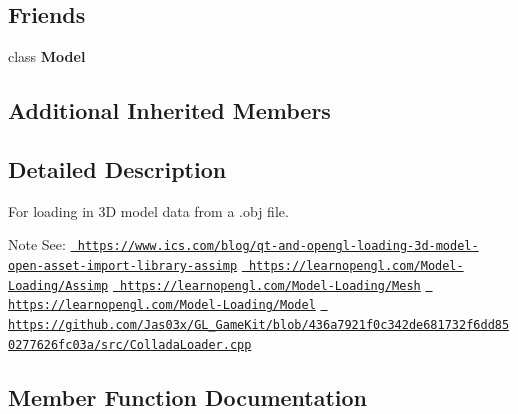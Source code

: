 \subsection*{Friends}
\begin{DoxyCompactItemize}
\item 
\mbox{\label{classrev_1_1_model_reader_a2bf2a0e9b454c55aa5dcb5aa4698697b}} 
class {\bfseries Model}
\end{DoxyCompactItemize}
\subsection*{Additional Inherited Members}


\subsection{Detailed Description}
For loading in 3D model data from a .obj file. 

\begin{DoxyNote}{Note}
See\+: \href{https://www.ics.com/blog/qt-and-opengl-loading-3d-model-open-asset-import-library-assimp}{\texttt{ https\+://www.\+ics.\+com/blog/qt-\/and-\/opengl-\/loading-\/3d-\/model-\/open-\/asset-\/import-\/library-\/assimp}} \href{https://learnopengl.com/Model-Loading/Assimp}{\texttt{ https\+://learnopengl.\+com/\+Model-\/\+Loading/\+Assimp}} \href{https://learnopengl.com/Model-Loading/Mesh}{\texttt{ https\+://learnopengl.\+com/\+Model-\/\+Loading/\+Mesh}} \href{https://learnopengl.com/Model-Loading/Model}{\texttt{ https\+://learnopengl.\+com/\+Model-\/\+Loading/\+Model}} \href{https://github.com/Jas03x/GL_GameKit/blob/436a7921f0c342de681732f6dd850277626fc03a/src/ColladaLoader.cpp}{\texttt{ https\+://github.\+com/\+Jas03x/\+G\+L\+\_\+\+Game\+Kit/blob/436a7921f0c342de681732f6dd850277626fc03a/src/\+Collada\+Loader.\+cpp}} 
\end{DoxyNote}


\subsection{Member Function Documentation}
\mbox{\label{classrev_1_1_model_reader_a8e7deec3987f6f7aa0537f43af5609d0}} 
